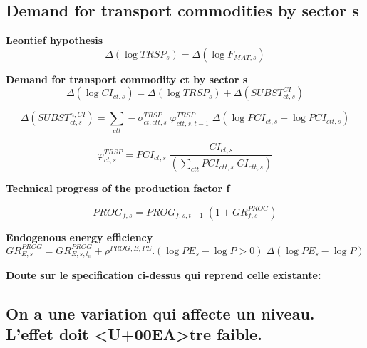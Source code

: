 \documentclass[12pt]{article}
\numberwithin{equation}{section}
\begin{document}
\subsection{Demand for transport commodities by sector s}


\textbf{Leontief hypothesis}
\begin{dmath}
\varDelta \left(\operatorname{log} TRSP_{s}\right) = \varDelta \left(\operatorname{log} F_{MAT, s}\right)
\end{dmath}

\textbf{Demand for transport commodity ct by sector s}
\begin{dmath}
\varDelta \left(\operatorname{log} CI_{ct, s}\right) = \varDelta \left(\operatorname{log} TRSP_{s}\right) + \varDelta \left(SUBST^{CI}_{ct, s}\right)
\end{dmath}

\begin{dmath}
\varDelta \left(SUBST^{n,CI}_{ct, s}\right) = \sum_{ctt} -\sigma^{TRSP}_{ct, ctt, s} \; \varphi^{TRSP}_{ctt, s, t-1} \; \varDelta \left(\operatorname{log} PCI_{ct, s} - \operatorname{log} PCI_{ctt, s}\right)
\end{dmath}

\begin{dmath}
\varphi^{TRSP}_{ct, s} = PCI_{ct, s} \; \frac{CI_{ct, s}}{\left( \sum_{ctt} PCI_{ctt, s} \; CI_{ctt, s} \right)}
\end{dmath}

\textbf{Technical progress of the production factor f}

\begin{dmath}
PROG_{f, s} = PROG_{f, s, t-1} \; \left( 1 + GR^{PROG}_{f, s} \right)
\end{dmath}

\textbf{Endogenous energy efficiency}
\begin{dmath}
GR^{PROG}_{E, s} = GR^{PROG}_{E, s, t_{0}} + \rho^{PROG,E,PE} . \left( \operatorname{log} PE_{s} - \operatorname{log} P > 0 \right) \; \varDelta \left(\operatorname{log} PE_{s} - \operatorname{log} P\right)
\end{dmath}

\textbf{Doute sur le specification ci-dessus qui reprend celle existante:}



\subsection{On a une variation qui affecte un niveau. L'effet doit <U+00EA>tre faible.}
\end{document}

